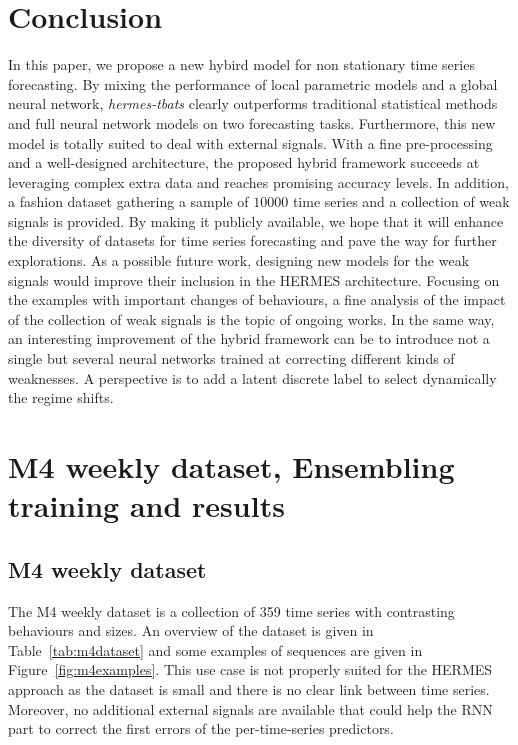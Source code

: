 \documentclass[10pt]{article} %
\newcommand{\numberts}{10000}
\begin{document}
\section{Conclusion}
\label{sec:conclusion}
In this paper, we propose  a new hybird model for non stationary time series forecasting. By mixing the performance of local parametric models and a global neural network, \textit{hermes-tbats} clearly outperforms traditional statistical methods and full neural network models on two forecasting tasks. Furthermore, this new model is totally suited to deal with external signals. With a fine pre-processing and a well-designed architecture, the proposed hybrid framework succeeds at leveraging complex extra data and reaches promising accuracy levels. In addition, a fashion dataset gathering a sample of $\numberts$ time series and a collection of weak signals is provided. By making it publicly available, we hope that it will enhance the diversity of datasets for time series forecasting and pave the way for further explorations.
As a possible future work, designing new models for the weak signals would improve their inclusion  in the HERMES architecture. Focusing on the examples with important changes of behaviours, a fine analysis of the impact of the collection of weak signals is the topic of ongoing works. In the same way, an interesting improvement of the hybrid framework can be to introduce not a single but several neural networks trained at correcting different kinds of weaknesses. A perspective is to add a latent discrete label to select dynamically the regime shifts. 




\appendix
\section{M4 weekly dataset, Ensembling training and results}

\subsection{M4 weekly dataset}
\label{sec:m4overview}
The M4 weekly dataset is a collection of 359 time series with  contrasting behaviours and sizes. An overview of the dataset is given in Table~\ref{tab:m4dataset} and some examples of sequences are given in Figure~\ref{fig:m4examples}. This use case is not properly suited for the HERMES approach as the dataset is small and there is no clear link between time series. Moreover, no additional external signals are available that could help the RNN part to correct the first errors of the per-time-series predictors.
\end{document}
